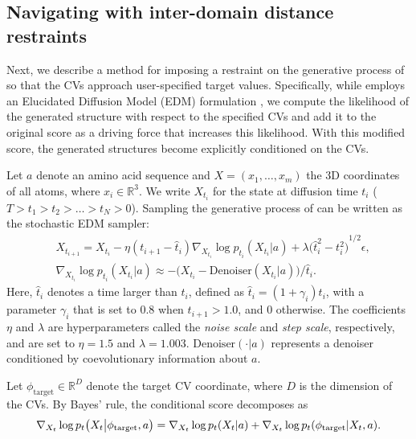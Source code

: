 \subsection{Navigating \AFiii with inter-domain distance restraints}
\label{subsec:navigating_af3}

Next, we describe a method for imposing a restraint on the generative process of \AFiii so that the CVs approach user-specified target values. 
Specifically, while \AFiii employs an Elucidated Diffusion Model (EDM) formulation \cite{karras2022elucidating}, we compute the likelihood of the generated structure with respect to the specified CVs and add it to the original \AFiii score as a driving force that increases this likelihood. With this modified score, the generated structures become explicitly conditioned on the CVs.

Let $a$ denote an amino acid sequence and $X=(x_1,\ldots,x_m)$ the 3D coordinates of all atoms, where $x_i\in\mathbb{R}^3$.
We write $X_{t_i}$ for the state at diffusion time $t_i$ ($T > t_1 > t_2 > \dots > t_N > 0$).
Sampling the generative process of \AFiii can be written as the stochastic EDM sampler:
\begin{equation}
    \begin{split}
        &X_{t_{i+1}} = X_{t_i} - \eta (t_{i+1} - \hat{t}_i) \nabla_{X_{t_i}} \log p_{t_i}(X_{t_i} | a) + \lambda {\big(\hat{t}_i^2 - t_i^2 \big)}^{1/2} \epsilon, \\
        &\nabla_{X_{t_i}} \log p_{t_i}(X_{t_i} | a) \approx - \bigl( X_{t_i} - \text{Denoiser}(X_{t_i} | a) \bigr) / \hat{t}_i.
    \end{split}
    \label{eq:af3-sde}
\end{equation}
Here, $\hat{t}_i$ denotes a time larger than $t_i$, defined as $\hat{t}_i = (1 + \gamma_i)t_i$, with a parameter $\gamma_i$ that is set to $0.8$ when $t_{i+1} > 1.0$, and $0$ otherwise. 
The coefficients $\eta$ and $\lambda$ are hyperparameters called the \textit{noise scale} and \textit{step scale}, respectively, and are set to $\eta = 1.5$ and $\lambda = 1.003$. 
$\text{Denoiser}(\cdot | a)$ represents a denoiser conditioned by coevolutionary information about $a$.

Let $\phi_{\text{target}} \in \mathbb{R}^D$ denote the target CV coordinate, where $D$ is the dimension of the CVs.
By Bayes’ rule, the conditional score decomposes as
\begin{equation}
    \begin{split}
        \nabla_{X_t} \log p_t \bigl(X_t \big| \phi_{\text{target}}, a \bigr) 
        = \nabla_{X_t} \log p_t(X_t | a) + \nabla_{X_t} \log p_t(\phi_{\text{target}} | X_t, a).
    \end{split}
    \label{eq:score-decomp}
\end{equation}


